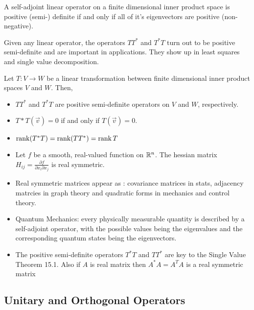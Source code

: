 \documentclass{article}
\begin{document}
\begin{nlemma}
  A self-adjoint linear operator on a finite dimensional inner product space is positive (semi-) definite if and only if all of it's eigenvectors are positive (non-negative).
\end{nlemma}

Given any linear operator, the operators $TT^*$ and $T^*T$ turn out to be positive semi-definite and are important in applications. They show up in least squares and single value decomposition.

\begin{nlemma}
  Let $T : V \to W$ be a linear transformation between finite dimensional inner product spaces $V$ and $W$. Then,
  \begin{itemize}
    \item $TT^*$ and $T^*T$ are positive semi-definite operators on $V$ and $W$, respectively.
    \item $T*T(\vec v) = 0$ if and only if $T(\vec v) = 0$.
    \item $\operatorname{rank}(T^*T) = \operatorname{rank}(TT^*) = \operatorname{rank} T$
  \end{itemize}
\end{nlemma}

\begin{eg}
  \begin{itemize}
    \item Let $f$ be a smooth, real-valued function on $\mathbb{R}^n$. The hessian matrix $H_{ij} = \frac{\partial f}{\partial x_i\partial x_j}$ is real symmetric.
    \item Real symmetric matrices appear as : covariance matrices in stats, adjacency matrcies in graph theory and quadratic forms in mechanics and control theory.
    \item Quantum Mechanics: every physically measurable quantity is described by a self-adjoint operator, with the possible values being the eigenvalues and the corresponding quantum states being the eigenvectors.
    \item The positive semi-definite operators $T^*T$ and $TT^*$ are key to the Single Value Theorem 15.1. Also if $A$ is real matrix then $A^*A = A^TA$ is a real symmetric matrix
  \end{itemize}
\end{eg}


\subsection{Unitary and Orthogonal Operators}
\end{document}
